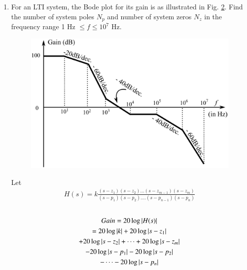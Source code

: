 \documentclass[journal,12pt,twocolumn]{IEEEtran}
\renewcommand\thesection{\arabic{section}}
\begin{document}
\begin{enumerate}[label=\arabic*.,ref=\thesection.\theenumi]
\begin{figure}
\caption{}
\label{fig:pic1}
\end{figure}
\item
For an LTI system, the Bode plot for its gain is as illustrated in Fig. \ref{fig:galaxy}. Find the number of system poles $N_{p}$ and number of system zeros $N_{z}$ in the frequency range 1 Hz $\leq f \leq 10^{7}$ Hz. 

\begin{figure}[!h]
    \centering
    \includegraphics[width=\columnwidth]{./figs/figure.eps}
\caption{}
      \label{fig:galaxy}
\end{figure}
\solution
Let
\begin{align}
H(s) = k \frac{(s-z_{1})(s-z_{2})...(s-z_{m-1})(s-z_{m})}{(s-p_{1})(s-p_{2})....(s-p_{n-1})(s-p_{n})}
\end{align}
\\
\begin{multline}
Gain = 20\log\left\vert H(s)\right\vert 
\\
= 20\log\left\vert k\right\vert + 20\log\left\vert s-z_{1}\right\vert 
\\
+ 20\log\left\vert s-z_{2}\right\vert + \dots + 20\log\left\vert s-z_{m}\right\vert 
\\
- 20\log\left\vert s-p_{1}\right\vert - 20\log\left\vert s-p_{2}\right\vert 
\\
-\dots - 20\log\left\vert s-p_{n}\right\vert 
\end{multline}


\end{enumerate}
\end{document}
